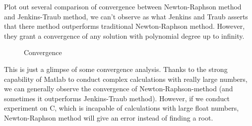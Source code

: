 \documentclass[11pt]{article}
\begin{document}
Plot out several comparison of convergence between Newton-Raphson method and Jenkins-Traub method, we can't observe as what Jenkins and Traub asserts that there method outperforms traditional Newton-Raphson method. However, they grant a convergence of any solution with polynomial degree up to infinity.
\begin{figure}[H]
	\centering
	\centering
	\caption{Convergence}
\end{figure}

This is just a glimpse of some convergence analysis. Thanks to the strong capability of Matlab to conduct complex calculations with really large numbers, we can generally observe the convergence of Newton-Raphson-method (and sometimes it outperforms Jenkins-Traub method). However, if we conduct experiment on C, which is incapable of calculations with large float numbers, Newton-Raphson method will give an error instead of finding a root.
\end{document}
